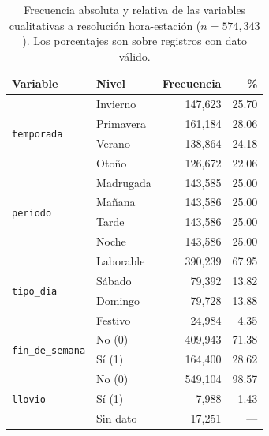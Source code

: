 \begin{table}[t]
  \centering
  \caption{Frecuencia absoluta y relativa de las variables cualitativas a
    resolución hora-estación ($n = 574{,}343$). Los porcentajes son sobre
    registros con dato válido.}
  \label{tab:freq-horaria}
  \small
  \begin{tabular}{llrr}
    \toprule
    Variable & Nivel & Frecuencia & \% \\
    \midrule
    \multirow{4}{*}{\texttt{temporada}}
                                  & Invierno  &   147,623 &  25.70 \\
                                  & Primavera &   161,184 &  28.06 \\
                                  & Verano    &   138,864 &  24.18 \\
                                  & Otoño     &   126,672 &  22.06 \\
    \midrule
    \multirow{4}{*}{\texttt{periodo}}
                                  & Madrugada &   143,585 &  25.00 \\
                                  & Mañana    &   143,586 &  25.00 \\
                                  & Tarde     &   143,586 &  25.00 \\
                                  & Noche     &   143,586 &  25.00 \\
    \midrule
    \multirow{4}{*}{\texttt{tipo\_dia}}
                                  & Laborable &   390,239 &  67.95 \\
                                  & Sábado    &    79,392 &  13.82 \\
                                  & Domingo   &    79,728 &  13.88 \\
                                  & Festivo   &    24,984 &   4.35 \\
    \midrule
    \multirow{2}{*}{\texttt{fin\_de\_semana}}
                                  & No (0)    &   409,943 &  71.38 \\
                                  & Sí (1)    &   164,400 &  28.62 \\
    \midrule
    \multirow{3}{*}{\texttt{llovio}}
                                  & No (0)    &   549,104 &  98.57 \\
                                  & Sí (1)    &     7,988 &   1.43 \\
                                  & Sin dato  &    17,251 &    --- \\
    \bottomrule
  \end{tabular}
\end{table}

